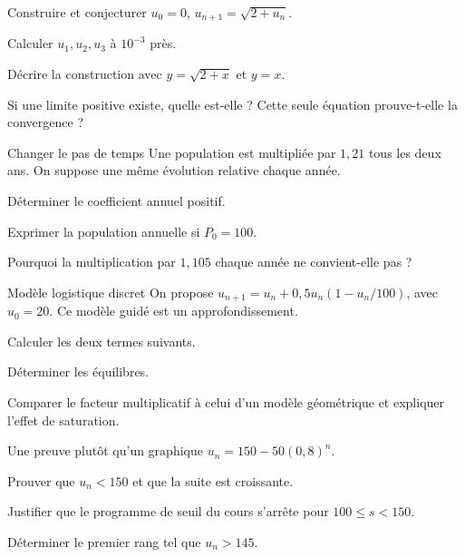 \begingroup\renewcommand{\otBesoinPlace}[1]{}\begin{minipage}{\linewidth}
\begin{exercice}[3]{Construire et conjecturer}
$u_0=0$, $u_{n+1}=\sqrt{2+u_n}$.
\begin{questions}
\item Calculer $u_1,u_2,u_3$ à $10^{-3}$ près.
\item Décrire la construction avec $y=\sqrt{2+x}$ et $y=x$.
\item Si une limite positive existe, quelle est-elle ? Cette seule équation prouve-t-elle la convergence ?
\end{questions}
\end{exercice}
\begin{exercice}[3]{Changer le pas de temps}
Une population est multipliée par $1{,}21$ tous les deux ans. On suppose une même évolution relative chaque année.
\begin{questions}
\item Déterminer le coefficient annuel positif.
\item Exprimer la population annuelle si $P_0=100$.
\item Pourquoi la multiplication par $1{,}105$ chaque année ne convient-elle pas ?
\end{questions}
\end{exercice}
\begin{exercice}[3]{Modèle logistique discret}
On propose $u_{n+1}=u_n+0{,}5u_n(1-u_n/100)$, avec $u_0=20$. Ce modèle guidé est un approfondissement.
\begin{questions}
\item Calculer les deux termes suivants.
\item Déterminer les équilibres.
\item Comparer le facteur multiplicatif à celui d’un modèle géométrique et expliquer l’effet de saturation.
\end{questions}
\end{exercice}
\begin{exercice}[3]{Une preuve plutôt qu’un graphique}
$u_n=150-50(0{,}8)^n$.
\begin{questions}
\item Prouver que $u_n<150$ et que la suite est croissante.
\item Justifier que le programme de seuil du cours s’arrête pour $100\leq s<150$.
\item Déterminer le premier rang tel que $u_n>145$.
\end{questions}
\end{exercice}
\end{minipage}\endgroup
